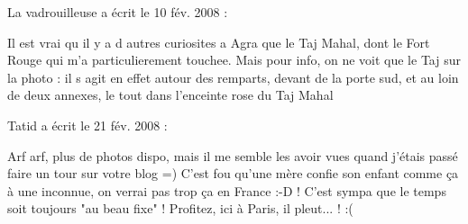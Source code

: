\medskip
La vadrouilleuse a écrit le 10 fév. 2008 :
\begin{displayquote}
Il est vrai qu il y a d autres curiosites a Agra que le Taj Mahal, dont le Fort Rouge qui m'a particulierement touchee. Mais pour info, on ne voit que le Taj sur la photo : il s agit en effet autour des remparts, devant de la porte sud, et au loin de deux annexes, le tout dans l'enceinte rose du Taj Mahal
\end{displayquote}

\medskip
Tatid a écrit le 21 fév. 2008 :
\begin{displayquote}
Arf arf, plus de photos dispo, mais il me semble les avoir vues quand j'étais passé faire un tour sur votre blog =)
C'est fou qu'une mère confie son enfant comme ça à une inconnue, on verrai pas trop ça en France :-D ! C'est sympa que le temps soit toujours "au beau fixe" ! Profitez, ici à Paris, il pleut... ! :(
\end{displayquote}
